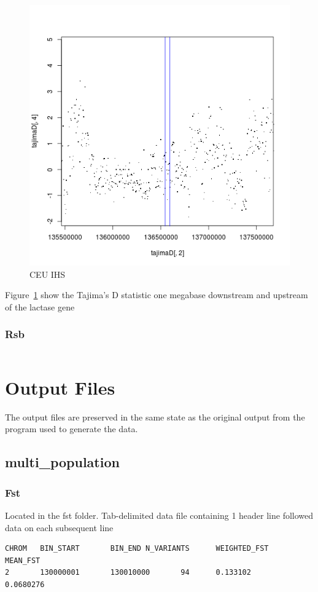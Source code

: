 \documentclass[a4paper,10pt]{article}
\begin{document}
\begin{figure}
\centering
\includegraphics{pictures/CEUtajimas.png}
\caption{CEU IHS}
\label{fig:taj}
\end{figure}

Figure~\ref{fig:taj} show the Tajima's D statistic one megabase downstream and upstream of the lactase gene


\subsubsection{Rsb}
\begin{verbatim}
\end{verbatim}
\section{Output Files}
The output files are preserved in the same state as the original output from the program used to generate the data.
\subsection{multi\_population}
\subsubsection{Fst}
Located in the fst folder. Tab-delimited data file containing 1 header line followed data on each subsequent line\\
\begin{verbatim}
CHROM   BIN_START       BIN_END N_VARIANTS      WEIGHTED_FST    MEAN_FST  
2       130000001       130010000       94      0.133102        0.0680276 
\end{verbatim}
\end{document}
